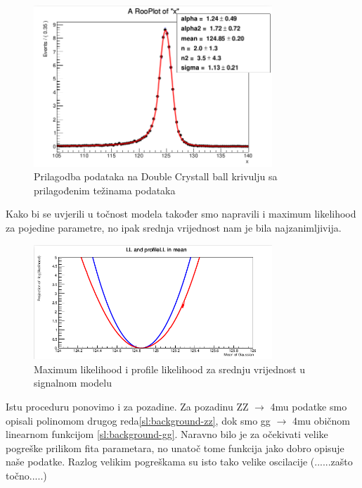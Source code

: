 \documentclass[12pt,a4paper,oneside]{article}
\begin{document}
\begin{linenumbers}
		\begin{figure}[h!]
			\centering
			\includegraphics[width=0.8\textwidth]{dcbfit-weight.png}
			\caption[Saturn viđen u ultraljubičastom svjetlu.]{\label{sl:dcbfitweight} Prilagodba podataka na Double Crystall ball krivulju sa prilagođenim težinama podataka}
		\end{figure}
	
		Kako bi se uvjerili u točnost modela također smo napravili i maximum likelihood za pojedine parametre, no ipak srednja vrijednost nam je bila najzanimljivija.
		
		\begin{figure}[h!]
			\centering
			\includegraphics[width=0.8\textwidth]{maxlike-mean.png}
			\caption[Saturn viđen u ultraljubičastom svjetlu.]{\label{sl:maxlike-mean} Maximum likelihood i profile likelihood za srednju vrijednost u signalnom modelu}
		\end{figure}
	
		Istu proceduru ponovimo i za pozadine. 
		Za pozadinu ZZ $\rightarrow$ 4mu podatke smo opisali polinomom drugog reda\ref{sl:background-zz}, dok smo gg $\rightarrow$ 4mu običnom linearnom funkcijom \ref{sl:background-gg}. Naravno bilo je za očekivati velike pogreške prilikom fita parametara, no unatoč tome funkcija jako dobro opisuje naše podatke. Razlog velikim pogreškama su isto tako velike oscilacije (......zašto točno.....)
		

\end{linenumbers}
\end{document}
